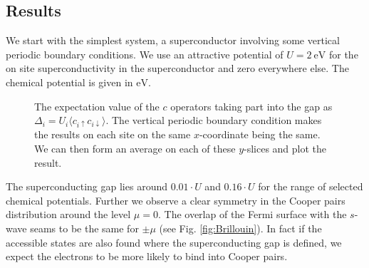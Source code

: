 \documentclass[..\main.tex]{subfile}
\begin{document}
\subsection{Results}
We start with the simplest system, a superconductor involving some vertical periodic boundary conditions.
We use an attractive potential of $U=\SI{2}{\electronvolt}$ for the on site superconductivity in the superconductor and zero everywhere else.
The chemical potential is given in $\si{\electronvolt}$.
\begin{figure}[H]
  \centering
  
  \caption{The expectation value of the $c$ operators taking part into the gap as $\Delta_i = U_i\langle c_{i\uparrow}c_{i\downarrow}\rangle$. The  
  vertical periodic boundary condition makes the results on each site on the same $x$-coordinate being the same.
    We can then form an average on each of these $y$-slices and plot the result.}
\end{figure}
The superconducting gap lies around $0.01\cdot U$ and $0.16\cdot U$ for the range of selected chemical potentials. Further we observe a 
clear symmetry in the Cooper pairs distribution around the level $\mu =0$. The overlap of the Fermi surface with the $s$-wave seams
to be the same for $\pm\mu$ (see Fig. \ref{fig:Brillouin}). In fact if the accessible states are also found where the superconducting gap 
is defined, we expect the electrons to be more likely to bind into Cooper pairs.
\end{document}
